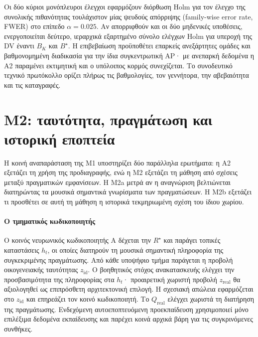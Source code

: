 \documentclass[a4paper]{article}
\newcommand{\Rs}{\ensuremath{R^{\star}}}
\newcommand{\Qreal}{\ensuremath{Q_{\mathrm{real}}}}
\begin{document}
Οι δύο κύριοι μονόπλευροι έλεγχοι εφαρμόζουν διόρθωση Holm για τον έλεγχο της συνολικής πιθανότητας τουλάχιστον μίας ψευδούς απόρριψης (family-wise error rate, FWER) στο επίπεδο $\alpha=0.025$. Αν απορριφθούν και οι δύο μηδενικές υποθέσεις, ενεργοποιείται δεύτερο, ιεραρχικά εξαρτημένο σύνολο ελέγχων Holm για υπεροχή της DV έναντι $B_K$ και $B^\star$. Η επιβεβαίωση προϋποθέτει επαρκείς ανεξάρτητες ομάδες και βαθμονομημένη διαδικασία για την ίδια συγκεντρωτική AP· με ανεπαρκή δεδομένα η Α2 παραμένει εκτιμητική και ο υπόλοιπος κορμός συνεχίζεται. Το συνοδευτικό τεχνικό πρωτόκολλο ορίζει πλήρως τις βαθμολογίες, τον γεννήτορα, την αβεβαιότητα και τις καταγραφές. 

\section{Μ2: ταυτότητα, πραγμάτωση και ιστορική εποπτεία}\label{sec:repr}
Η κοινή αναπαράσταση της Μ1 υποστηρίζει δύο παράλληλα ερωτήματα: η Α2 εξετάζει τη χρήση της προδιαγραφής, ενώ η Μ2 εξετάζει τη μάθηση από σχέσεις μεταξύ πραγματικών εμφανίσεων. Η Μ2a μετρά αν η αναγνώριση βελτιώνεται διατηρώντας τα μουσικά σημαντικά γνωρίσματα των πραγματώσεων. Η Μ2b εξετάζει τι προσθέτει σε αυτή τη μάθηση η ιστορικά τεκμηριωμένη σχέση του ίδιου χωρίου.

\paragraph{Ο τμηματικός κωδικοποιητής}
Ο κοινός νευρωνικός κωδικοποιητής A δέχεται την $\Rs$ και παράγει τοπικές καταστάσεις $h_t$, οι οποίες διατηρούν τη μουσικά σημαντική πληροφορία της συγκεκριμένης πραγμάτωσης. Από κάθε υποψήφιο τμήμα παράγεται η προβολή οικογενειακής ταυτότητας $z_{\mathrm{id}}$. Ο βοηθητικός στόχος ανακατασκευής ελέγχει την προσβασιμότητα της πληροφορίας στα $h_t$· προαιρετική χωριστή προβολή $z_{\mathrm{real}}$ θα αξιολογηθεί ως επιπρόσθετη αρχιτεκτονική επιλογή. Η σχεσιακή απώλεια εφαρμόζεται στο $z_{\mathrm{id}}$ και επηρεάζει τον κοινό κωδικοποιητή. Το $\Qreal$ ελέγχει χωριστά τη διατήρηση της πραγμάτωσης. Ενδεχόμενη αυτοεποπτευόμενη προεκπαίδευση χρησιμοποιεί μόνο επιλέξιμα δεδομένα εκπαίδευσης και παρέχει κοινά αρχικά βάρη για τις συγκρινόμενες συνθήκες.
\end{document}
